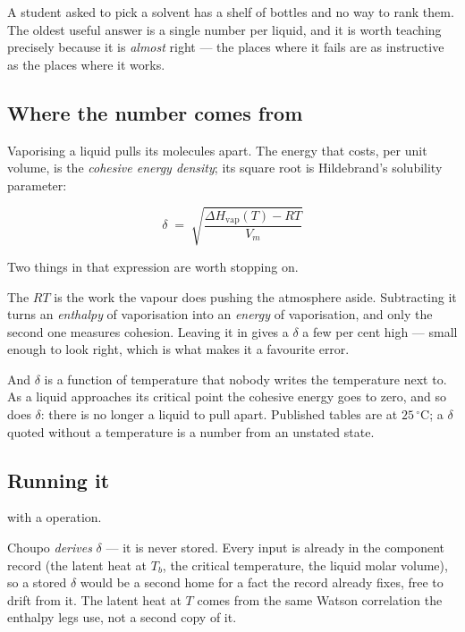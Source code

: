 \documentclass[11pt,a4paper]{article}
\begin{document}
A student asked to pick a solvent has a shelf of bottles and no way to
rank them.  The oldest useful answer is a single number per liquid, and
it is worth teaching precisely because it is \emph{almost} right --- the
places where it fails are as instructive as the places where it works.

\subsection{Where the number comes from}

Vaporising a liquid pulls its molecules apart.  The energy that costs,
per unit volume, is the \emph{cohesive energy density}; its square root
is Hildebrand's solubility parameter:

\begin{equation}
  \delta \;=\; \sqrt{\frac{\Delta H_{\mathrm{vap}}(T) - RT}{V_m}}
  \label{eq:hildebrand}
\end{equation}

Two things in that expression are worth stopping on.

The $RT$ is the work the vapour does pushing the atmosphere aside.
Subtracting it turns an \emph{enthalpy} of vaporisation into an
\emph{energy} of vaporisation, and only the second one measures cohesion.
Leaving it in gives a $\delta$ a few per cent high --- small enough to
look right, which is what makes it a favourite error.

And $\delta$ is a function of temperature that nobody writes the
temperature next to.  As a liquid approaches its critical point the
cohesive energy goes to zero, and so does $\delta$: there is no longer a
liquid to pull apart.  Published tables are at $25\,^\circ$C; a
$\delta$ quoted without a temperature is a number from an unstated state.

\subsection{Running it}

\begin{center}
 with a  operation.
\end{center}

Choupo \emph{derives} $\delta$ --- it is never stored.  Every input is
already in the component record (the latent heat at $T_b$, the critical
temperature, the liquid molar volume), so a stored $\delta$ would be a
second home for a fact the record already fixes, free to drift from it.
The latent heat at $T$ comes from the same Watson correlation the
enthalpy legs use, not a second copy of it.
\end{document}
